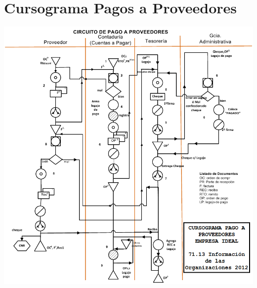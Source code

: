 \pagebreak
\section{Cursograma Pagos a Proveedores}
\begin{center}
 \includegraphics[scale=0.75,keepaspectratio=true]{./Circuitos-Teoricos/Pago-a-Proveedores/Images/cursograma-pago-a-proveedores.png}
\end{center}

